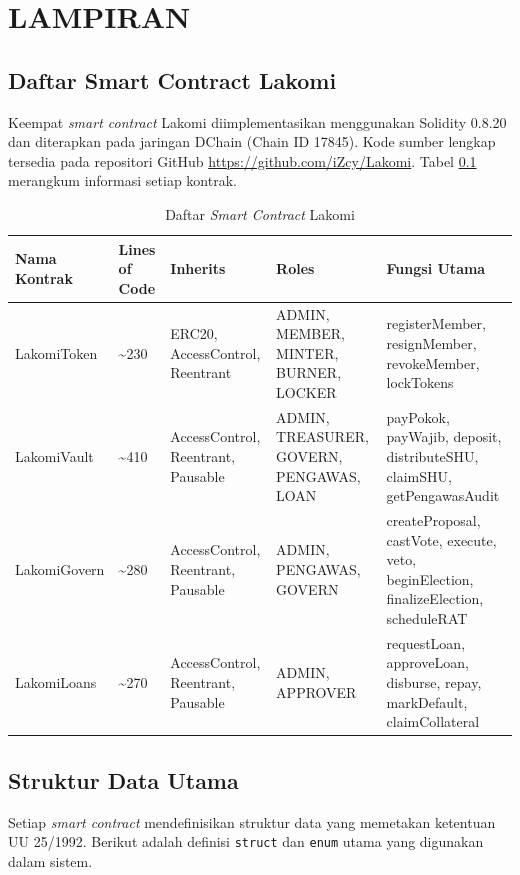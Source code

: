 \chapter*{LAMPIRAN}

\section{Daftar Smart Contract Lakomi}

Keempat \textit{smart contract} Lakomi diimplementasikan menggunakan Solidity 0.8.20 dan diterapkan pada jaringan DChain (Chain ID 17845). Kode sumber lengkap tersedia pada repositori GitHub \url{https://github.com/iZcy/Lakomi}. Tabel \ref{tab:contract-list} merangkum informasi setiap kontrak.

\begin{table}[H]
\centering
\caption{Daftar \textit{Smart Contract} Lakomi}
\label{tab:contract-list}
\footnotesize
\begin{tabular}{p{}p{}p{}p{}p{}}
\toprule
\textbf{Nama Kontrak} & \textbf{Lines of Code} & \textbf{Inherits} & \textbf{Roles} & \textbf{Fungsi Utama} \\
\midrule
LakomiToken & \textasciitilde 230 & ERC20, AccessControl, Reentrant & ADMIN, MEMBER, MINTER, BURNER, LOCKER & registerMember, resignMember, revokeMember, lockTokens \\
\midrule
LakomiVault & \textasciitilde 410 & AccessControl, Reentrant, Pausable & ADMIN, TREASURER, GOVERN, PENGAWAS, LOAN & payPokok, payWajib, deposit, distributeSHU, claimSHU, getPengawasAudit \\
\midrule
LakomiGovern & \textasciitilde 280 & AccessControl, Reentrant, Pausable & ADMIN, PENGAWAS, GOVERN & createProposal, castVote, execute, veto, beginElection, finalizeElection, scheduleRAT \\
\midrule
LakomiLoans & \textasciitilde 270 & AccessControl, Reentrant, Pausable & ADMIN, APPROVER & requestLoan, approveLoan, disburse, repay, markDefault, claimCollateral \\
\bottomrule
\end{tabular}
\end{table}

\section{Struktur Data Utama}

Setiap \textit{smart contract} mendefinisikan struktur data yang memetakan ketentuan UU 25/1992. Berikut adalah definisi \texttt{struct} dan \texttt{enum} utama yang digunakan dalam sistem.

